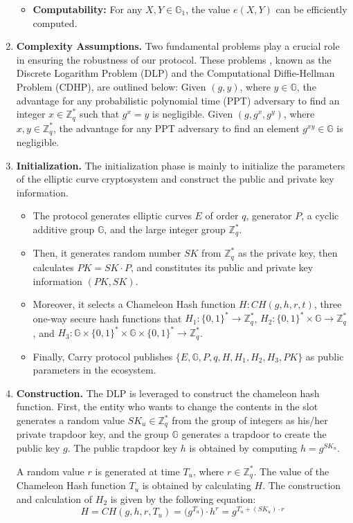 \begin{enumerate}[label=(\arabic*)]
\begin{itemize}
\item \textbf{Computability:} For any $X, Y \in \mathbb{G}_1$, the value $e(X, Y)$ can be efficiently computed.
\end{itemize}
    \item \textbf{Complexity Assumptions.} Two fundamental problems play a crucial role in ensuring the robustness of our protocol. These problems \cite{jalaja2023new,mahdavi2023new}, known as the Discrete Logarithm Problem (DLP) and the Computational Diffie-Hellman Problem (CDHP), are outlined below: Given $(g,y)$, where $y\in \mathbb{G}$, the advantage for any probabilistic polynomial time (PPT) adversary to find an integer $x\in \mathbb{Z}_q^\ast$ such that $g^x=y$ is negligible. Given $(g,g^x,g^y)$, where $x,y\in \mathbb{Z}_q^\ast$, the advantage for any PPT adversary to find an element $g^{xy}\in \mathbb{G}$ is negligible.
    \item \textbf{Initialization.} The initialization phase is mainly to initialize the parameters of the elliptic curve cryptosystem and construct the public and private key information.
    \begin{itemize}
        \item The protocol generates elliptic curves $E$ of order $q$, generator $P$, a cyclic additive group $\mathbb{G}$, and the large integer group $\mathbb{Z}_q^\ast$. 
        \item Then, it generates random number $SK$ from $\mathbb{Z}_q^\ast$ as the private key, then calculates $PK = SK\cdot P$, and constitutes its public and private key information $(PK,SK)$. 
        \item Moreover, it selects a Chameleon Hash function $H:CH(g,h,r,t)$, three one-way secure hash functions that $H_1:\{0,1\}^\ast\rightarrow \mathbb{Z}_q^\ast$, $H_2:\{0,1\}^\ast\times \mathbb{G}\rightarrow \mathbb{Z}_q^\ast$, and $H_3: \mathbb{G} \times \{0,1\}^\ast \times \mathbb{G} \times \{0,1\}^\ast \rightarrow \mathbb{Z}_q^\ast$. 
        \item Finally, Carry protocol publishes $\{E,\mathbb{G},P,q,H,H_1,H_2,H_3,PK\}$ as public parameters in the ecosystem.
     \end{itemize}
    \item \textbf{Construction.} The DLP is leveraged to construct the chameleon hash function. First, the entity who wants to change the contents in the slot generates a random value $SK_u \in \mathbb{Z}_q^\ast$ from the group of integers as his/her private trapdoor key, and the group $\mathbb{G}$ generates a trapdoor to create the public key $g$. The public trapdoor key $h$ is obtained by computing $h=g^{SK_u}$.

    A random value $r$ is generated at time $T_u$, where $r \in \mathbb{Z}_q^\ast$. The value of the Chameleon Hash function $T_u$ is obtained by calculating $H$. The construction and calculation of $H_2$ is given by the following equation:
    \begin{equation}
       H= CH(g,h,r,T_u)=\big(g^{T_u}\big)\cdot h^r=g^{T_u+(SK_u)\cdot r}
    \end{equation}
\end{enumerate}


